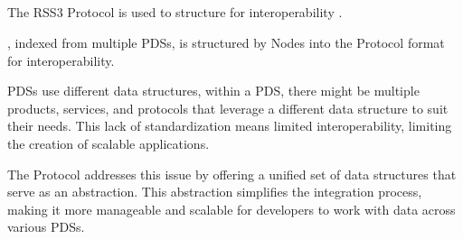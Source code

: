\subsection{}
\label{subsec:protocol}

The RSS3 Protocol is used to structure  for interoperability \cite{protocol}.

, indexed from multiple \glspl{PDS}, is structured by \glspl{Node} into the \gls{Protocol} format for interoperability.

\glspl{PDS} use different data structures, within a \gls{PDS}, there might be multiple products, services, and protocols that leverage a different data structure to suit their needs.
This lack of standardization means limited interoperability, limiting the creation of scalable applications.

The \gls{Protocol} addresses this issue by offering a unified set of data structures that serve as an abstraction.
This abstraction simplifies the integration process, making it more manageable and scalable for developers to work with data across various \glspl{PDS}.
